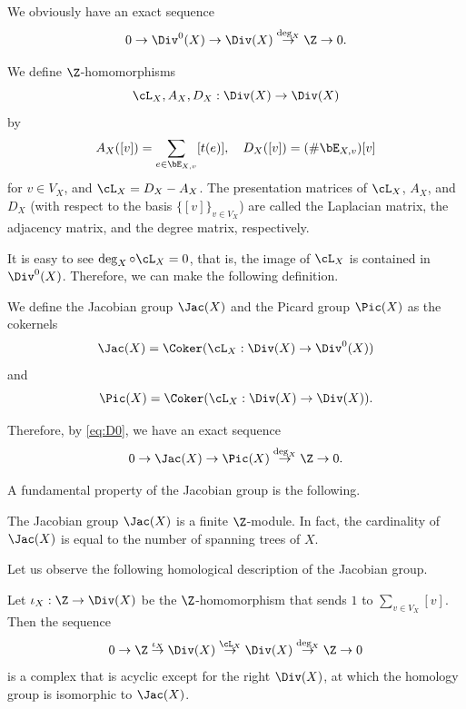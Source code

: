 We obviously have an exact sequence
\begin{equation}\label{eq:D0}
0 \to \Div^0(X) \to \Div(X) \overset{\deg_X}{\to} \Z \to 0.
\end{equation}

\begin{defi}\label{defn:LAD}
We define $\Z$-homomorphisms
\[
\cL_X, A_X, D_X: \Div(X) \to \Div(X)
\]
by
\[
A_X([v]) = \sum_{e \in \bE_{X, v}} [t(e)],
\quad
D_X([v]) = (\# \bE_{X, v}) [v]
\]
for $v \in V_X$, and $\cL_X = D_X - A_X$.
The presentation matrices of $\cL_X$, $A_X$, and $D_X$ (with respect to the basis $\{ [v] \}_{v \in V_X}$) are called the Laplacian matrix, the adjacency matrix, and the degree matrix, respectively.
\end{defi}

It is easy to see $\deg_X \circ \cL_X = 0$, that is, the image of $\cL_X$ is contained in $\Div^0(X)$.
Therefore, we can make the following definition.

\begin{defi}\label{defn:JP}
We define the Jacobian group $\Jac(X)$ and the Picard group $\Pic(X)$ as the cokernels
\[
\Jac(X) = \Coker(\cL_X: \Div(X) \to \Div^0(X))
\]
and
\[
\Pic(X) = \Coker(\cL_X: \Div(X) \to \Div(X)).
\]
\end{defi}

Therefore, by \eqref{eq:D0}, we have an exact sequence
\begin{equation}\label{eq:JP_ex}
0 \to \Jac(X) \to \Pic(X) \overset{\deg_X}{\to} \Z\to 0.
\end{equation}

A fundamental property of the Jacobian group is the following.

\begin{thm}\label{thm:Kirch}
The Jacobian group $\Jac(X)$ is a finite $\Z$-module.
In fact, the cardinality of $\Jac(X)$ is equal to the number of spanning trees of $X$.
\end{thm}

Let us observe the following homological description of the Jacobian group.

\begin{lemm}\label{lem:cpx_J}
Let $\iota_X: \Z \to \Div(X)$ be the $\Z$-homomorphism that sends $1$ to $\sum_{v \in V_X} [v]$.
Then the sequence
\begin{equation}\label{eq:cpx_J}
0 \to \Z \overset{\iota_X}{\to} \Div(X) \overset{\cL_X}{\to} \Div(X) \overset{\deg_X}{\to} \Z \to 0
\end{equation}
is a complex that is acyclic except for the right $\Div(X)$, at which the homology group is isomorphic to $\Jac(X)$.
\end{lemm}

